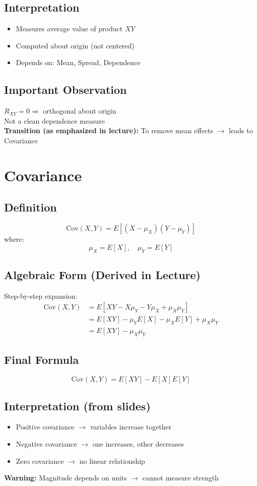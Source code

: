 \documentclass[11pt]{article}
\begin{document}
\subsection{Interpretation}
\begin{itemize}
    \item Measures average value of product $XY$
    \item Computed about origin (not centered)
    \item Depends on: Mean, Spread, Dependence
\end{itemize}

\subsection{Important Observation}
$R_{XY} = 0 \Rightarrow$ orthogonal about origin \\
Not a clean dependence measure \\

\textbf{Transition (as emphasized in lecture):}
To remove mean effects $\rightarrow$ leads to Covariance

\section{Covariance}
\subsection{Definition}
\[ \text{Cov}(X,Y) = E[(X - \mu_X)(Y - \mu_Y)] \]
where:
\[ \mu_X = E[X], \quad \mu_Y = E[Y] \]

\subsection{Algebraic Form (Derived in Lecture)}
Step-by-step expansion:
\begin{align*}
\text{Cov}(X,Y) &= E[XY - X\mu_Y - Y\mu_X + \mu_X\mu_Y] \\
&= E[XY] - \mu_Y E[X] - \mu_X E[Y] + \mu_X\mu_Y \\
&= E[XY] - \mu_X \mu_Y
\end{align*}

\subsection{Final Formula}
\[ \text{Cov}(X,Y) = E[XY] - E[X]E[Y] \]

\subsection{Interpretation (from slides)}
\begin{itemize}
    \item Positive covariance $\rightarrow$ variables increase together
    \item Negative covariance $\rightarrow$ one increases, other decreases
    \item Zero covariance $\rightarrow$ no linear relationship
\end{itemize}
\textbf{Warning:} Magnitude depends on units $\rightarrow$ cannot measure strength
\end{document}

